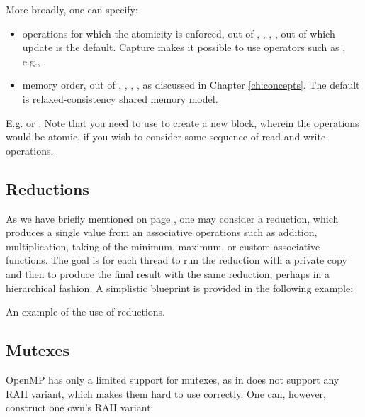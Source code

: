 More broadly, one can specify:
\begin{itemize}
\item operations for which the atomicity is enforced, out of ,  , , , out of which update is the default. Capture makes it possible to use operators such as \cpp{+=}, e.g., .
\item memory order, out of , , ,  ,   as discussed in Chapter \ref{ch:concepts}. The default is relaxed-consistency shared memory model.
\end{itemize}

E.g.  or .
Note that you need to use \cpp{{}} to create a new block, wherein the operations would be atomic, if you wish to consider some sequence of read and write operations. 

\subsection{Reductions}

As we have briefly mentioned on page \pageref{sec:reduction1}, one may consider a reduction, which produces a single value from an associative operations such as addition, multiplication, taking of the minimum, maximum, or custom associative functions. The goal is for each thread to run the reduction with a private copy and then to produce the final result with the same reduction, perhaps in a hierarchical fashion. A simplistic blueprint is provided in the following example:

\raggedbottom
\begin{codebox}[]{\href{https://godbolt.org/z/orfM3x13M}{\ExternalLink}}
\footnotesize An example of the use of reductions.
\tcblower
{}
\end{codebox}

\subsection{Mutexes}

OpenMP has only a limited support for mutexes, as in does not support any RAII variant, 
which makes them hard to use correctly. One can, however, construct one own's RAII variant:


